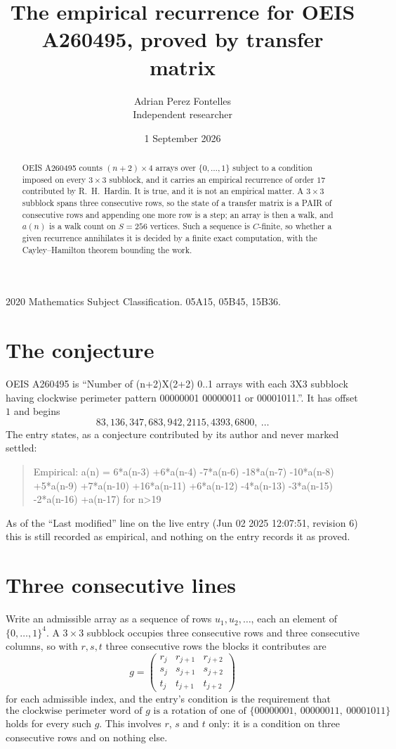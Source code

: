 \documentclass[11pt,a4paper]{article}
\title{The empirical recurrence for OEIS A260495, proved by transfer matrix}
\author{Adrian Perez Fontelles\\ \small Independent researcher}
\date{1 September 2026}
\theoremstyle{plain}
\theoremstyle{definition}
\begin{document}
\maketitle

\begin{abstract}
OEIS A260495 counts $(n+2)\times4$ arrays over $\{0,\dots,1\}$ subject to a condition imposed on
every $3\times3$ subblock, and it carries an empirical recurrence of order $17$
contributed by R.~H.~Hardin. It is true, and it is not an empirical matter. A $3\times3$
subblock spans three consecutive rows, so the state of a transfer matrix is a PAIR of
consecutive rows and appending one more row is a step; an array is then a walk, and
$a(n)$ is a walk count on $S=256$ vertices. Such a sequence is $C$-finite, so whether a given
recurrence annihilates it is decided by a finite exact computation, with the Cayley--Hamilton
theorem bounding the work.
\end{abstract}

\noindent\small 2020 Mathematics Subject Classification. 05A15, 05B45, 15B36.\normalsize

\section{The conjecture}

OEIS A260495 is ``Number of (n+2)X(2+2) 0..1 arrays with each 3X3 subblock having clockwise perimeter pattern 00000001 00000011 or 00001011.''. It has offset $1$ and begins
\[
83, 136, 347, 683, 942, 2115, 4393, 6800,\ \dots
\]
The entry states, as a conjecture contributed by its author and never marked settled:
\begin{quote}
Empirical: a(n) = 6*a(n-3) +6*a(n-4) -7*a(n-6) -18*a(n-7) -10*a(n-8) +5*a(n-9) +7*a(n-10) +16*a(n-11) +6*a(n-12) -4*a(n-13) -3*a(n-15) -2*a(n-16) +a(n-17) for n>19
\end{quote}
As of the ``Last modified'' line on the live entry (Jun 02 2025 12:07:51, revision 6) this is still
recorded as empirical, and nothing on the entry records it as proved.

\section{Three consecutive lines}

Write an admissible array as a sequence of rows $u_1,u_2,\dots$, each an element of
$\{0,\dots,1\}^{4}$. A $3\times3$ subblock occupies three consecutive rows and
three consecutive columns, so with $r,s,t$ three consecutive rows the blocks it
contributes are
\[
g=\begin{pmatrix}r_j&r_{j+1}&r_{j+2}\\ s_j&s_{j+1}&s_{j+2}\\ t_j&t_{j+1}&t_{j+2}\end{pmatrix}
\]
for each admissible index, and the entry's condition is the requirement that
\[
\text{the clockwise perimeter word of }g\text{ is a rotation of one of }\{00000001,\ 00000011,\ 00001011\}
\]
holds for every such $g$. This involves $r$, $s$ and $t$ only: it is a condition on
three consecutive rows and on nothing else.
\end{document}
